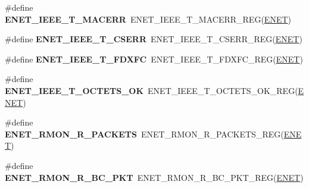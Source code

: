 \begin{DoxyCompactItemize}
\item 
\#define {\bfseries E\+N\+E\+T\+\_\+\+I\+E\+E\+E\+\_\+\+T\+\_\+\+M\+A\+C\+E\+RR}~E\+N\+E\+T\+\_\+\+I\+E\+E\+E\+\_\+\+T\+\_\+\+M\+A\+C\+E\+R\+R\+\_\+\+R\+EG(\hyperlink{group__ENET__Peripheral__Access__Layer_ga4745105f505f3ab949d6a57fbe2a0ed5}{E\+N\+ET})\hypertarget{group__ENET__Register__Accessor__Macros_ga38b6b791435ad388824e6a0a20637452}{}\label{group__ENET__Register__Accessor__Macros_ga38b6b791435ad388824e6a0a20637452}

\item 
\#define {\bfseries E\+N\+E\+T\+\_\+\+I\+E\+E\+E\+\_\+\+T\+\_\+\+C\+S\+E\+RR}~E\+N\+E\+T\+\_\+\+I\+E\+E\+E\+\_\+\+T\+\_\+\+C\+S\+E\+R\+R\+\_\+\+R\+EG(\hyperlink{group__ENET__Peripheral__Access__Layer_ga4745105f505f3ab949d6a57fbe2a0ed5}{E\+N\+ET})\hypertarget{group__ENET__Register__Accessor__Macros_ga21185b524641acfbeb1f2c5f1c7231bc}{}\label{group__ENET__Register__Accessor__Macros_ga21185b524641acfbeb1f2c5f1c7231bc}

\item 
\#define {\bfseries E\+N\+E\+T\+\_\+\+I\+E\+E\+E\+\_\+\+T\+\_\+\+F\+D\+X\+FC}~E\+N\+E\+T\+\_\+\+I\+E\+E\+E\+\_\+\+T\+\_\+\+F\+D\+X\+F\+C\+\_\+\+R\+EG(\hyperlink{group__ENET__Peripheral__Access__Layer_ga4745105f505f3ab949d6a57fbe2a0ed5}{E\+N\+ET})\hypertarget{group__ENET__Register__Accessor__Macros_ga3816e7205f62c6b5a14dd88ef4cc0363}{}\label{group__ENET__Register__Accessor__Macros_ga3816e7205f62c6b5a14dd88ef4cc0363}

\item 
\#define {\bfseries E\+N\+E\+T\+\_\+\+I\+E\+E\+E\+\_\+\+T\+\_\+\+O\+C\+T\+E\+T\+S\+\_\+\+OK}~E\+N\+E\+T\+\_\+\+I\+E\+E\+E\+\_\+\+T\+\_\+\+O\+C\+T\+E\+T\+S\+\_\+\+O\+K\+\_\+\+R\+EG(\hyperlink{group__ENET__Peripheral__Access__Layer_ga4745105f505f3ab949d6a57fbe2a0ed5}{E\+N\+ET})\hypertarget{group__ENET__Register__Accessor__Macros_ga3cae3e7cfe281844ec9bac51afdba9f0}{}\label{group__ENET__Register__Accessor__Macros_ga3cae3e7cfe281844ec9bac51afdba9f0}

\item 
\#define {\bfseries E\+N\+E\+T\+\_\+\+R\+M\+O\+N\+\_\+\+R\+\_\+\+P\+A\+C\+K\+E\+TS}~E\+N\+E\+T\+\_\+\+R\+M\+O\+N\+\_\+\+R\+\_\+\+P\+A\+C\+K\+E\+T\+S\+\_\+\+R\+EG(\hyperlink{group__ENET__Peripheral__Access__Layer_ga4745105f505f3ab949d6a57fbe2a0ed5}{E\+N\+ET})\hypertarget{group__ENET__Register__Accessor__Macros_ga320eaab3591dd85652568ed41eb0e816}{}\label{group__ENET__Register__Accessor__Macros_ga320eaab3591dd85652568ed41eb0e816}

\item 
\#define {\bfseries E\+N\+E\+T\+\_\+\+R\+M\+O\+N\+\_\+\+R\+\_\+\+B\+C\+\_\+\+P\+KT}~E\+N\+E\+T\+\_\+\+R\+M\+O\+N\+\_\+\+R\+\_\+\+B\+C\+\_\+\+P\+K\+T\+\_\+\+R\+EG(\hyperlink{group__ENET__Peripheral__Access__Layer_ga4745105f505f3ab949d6a57fbe2a0ed5}{E\+N\+ET})\hypertarget{group__ENET__Register__Accessor__Macros_gaebf9ade1ddf074f64cb7d3880cf48ffe}{}\label{group__ENET__Register__Accessor__Macros_gaebf9ade1ddf074f64cb7d3880cf48ffe}


\end{DoxyCompactItemize}
